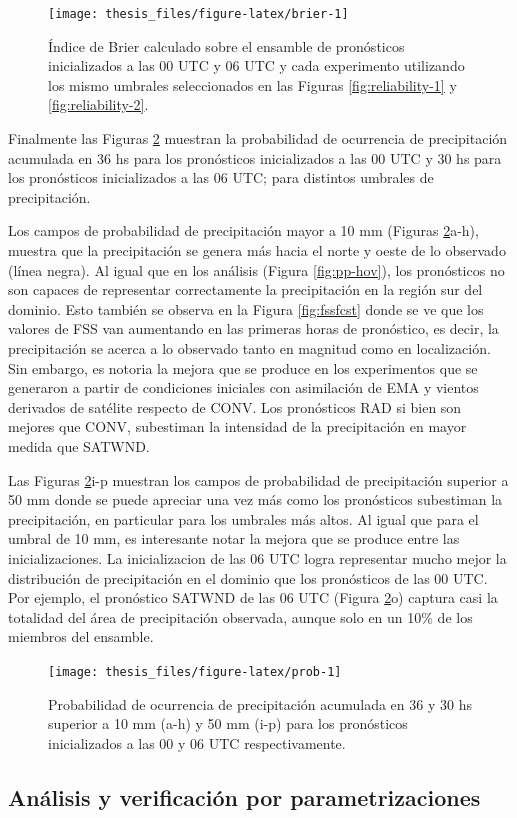 \documentclass[12pt,oneside,a4paper]{reedthesis}
\begin{document}
\begin{figure}

{\centering \texttt{[image: thesis\_files/figure-latex/brier-1]} 

}

\caption{Índice de Brier calculado sobre el ensamble de pronósticos inicializados a las 00 UTC y 06 UTC y cada experimento utilizando los mismo umbrales seleccionados en las Figuras \ref{fig:reliability-1} y \ref{fig:reliability-2}.}\label{fig:brier}
\end{figure}
Finalmente las Figuras \ref{fig:prob} muestran la probabilidad de ocurrencia de precipitación acumulada en 36 hs para los pronósticos inicializados a las 00 UTC y 30 hs para los pronósticos inicializados a las 06 UTC; para distintos umbrales de precipitación.

Los campos de probabilidad de precipitación mayor a 10 mm (Figuras \ref{fig:prob}a-h), muestra que la precipitación se genera más hacia el norte y oeste de lo observado (línea negra). Al igual que en los análisis (Figura \ref{fig:pp-hov}), los pronósticos no son capaces de representar correctamente la precipitación en la región sur del dominio. Esto también se observa en la Figura \ref{fig:fssfcst} donde se ve que los valores de FSS van aumentando en las primeras horas de pronóstico, es decir, la precipitación se acerca a lo observado tanto en magnitud como en localización. Sin embargo, es notoria la mejora que se produce en los experimentos que se generaron a partir de condiciones iniciales con asimilación de EMA y vientos derivados de satélite respecto de CONV. Los pronósticos RAD si bien son mejores que CONV, subestiman la intensidad de la precipitación en mayor medida que SATWND.

Las Figuras \ref{fig:prob}i-p muestran los campos de probabilidad de precipitación superior a 50 mm donde se puede apreciar una vez más como los pronósticos subestiman la precipitación, en particular para los umbrales más altos. Al igual que para el umbral de 10 mm, es interesante notar la mejora que se produce entre las inicializaciones. La inicializacion de las 06 UTC logra representar mucho mejor la distribución de precipitación en el dominio que los pronósticos de las 00 UTC. Por ejemplo, el pronóstico SATWND de las 06 UTC (Figura \ref{fig:prob}o) captura casi la totalidad del área de precipitación observada, aunque solo en un 10\% de los miembros del ensamble.


\begin{figure}

{\centering \texttt{[image: thesis\_files/figure-latex/prob-1]} 

}

\caption{Probabilidad de ocurrencia de precipitación acumulada en 36 y 30 hs superior a 10 mm (a-h) y 50 mm (i-p) para los pronósticos inicializados a las 00 y 06 UTC respectivamente.}\label{fig:prob}
\end{figure}
\hypertarget{anuxe1lisis-y-verificaciuxf3n-por-parametrizaciones}{%
\subsection{Análisis y verificación por parametrizaciones}\label{anuxe1lisis-y-verificaciuxf3n-por-parametrizaciones}}
\end{document}
